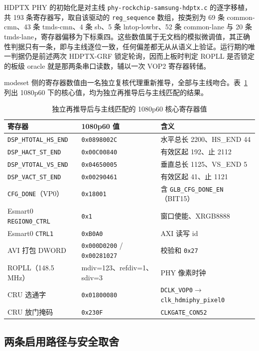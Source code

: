 HDPTX PHY 的初始化是对主线 \texttt{phy-rockchip-samsung-hdptx.c} 的逐字移植，共 193 条寄存器写，取自该驱动的 \texttt{reg\_sequence} 数组，按类别为 69 条 common-cmn、43 条 tmds-cmn、4 条 sb、5 条 lntop-lowbr、52 条 common-lane 与 20 条 tmds-lane，寄存器偏移为下标乘四。这些数值属于无文档的模拟微调值，其正确性判据只有一条，即与主线逐位一致，任何偏差都无从从语义上验证。运行期的唯一判据仍是前述两次 HDPTX-GRF 锁定轮询，因而上板时判定 ROPLL 是否锁定的板级 oracle 就是那两条串口读数，辅以一次 VOP2 寄存器转储。

modeset 侧的寄存器数值由一名独立复核代理重新推导，全部与主线吻合。表~\ref{tab:disp-regs} 列出 1080p60 下的核心值，均为独立再推导后与主线匹配的结果。

\begin{table}[H]\centering\small
\begin{tabular}{@{}>{\raggedright\arraybackslash}p{4.6cm}>{\raggedright\arraybackslash}p{4.4cm}>{\raggedright\arraybackslash}p{3.2cm}@{}}
\toprule
寄存器 & 1080p60 值 & 含义 \\
\midrule
\texttt{DSP\_HTOTAL\_HS\_END} & \texttt{0x0898002C} & 水平总长 2200、HS\_END 44 \\
\texttt{DSP\_HACT\_ST\_END} & \texttt{0x00C00840} & 有效区起 192、止 2112 \\
\texttt{DSP\_VTOTAL\_VS\_END} & \texttt{0x04650005} & 垂直总长 1125、VS\_END 5 \\
\texttt{DSP\_VACT\_ST\_END} & \texttt{0x00290461} & 有效区起 41、止 1121 \\
\texttt{CFG\_DONE}（VP0） & \texttt{0x18001} & 含 \texttt{GLB\_CFG\_DONE\_EN}（BIT15） \\
Esmart0 \texttt{REGION0\_CTRL} & \texttt{0x1} & 窗口使能、XRGB8888 \\
Esmart0 \texttt{CTRL1} & \texttt{0xB0A0} & AXI 读写 id \\
AVI 打包 DWORD & \texttt{0x000D0200} / \texttt{0x00281027} & 校验和 \texttt{0x27} \\
ROPLL（148.5 MHz） & mdiv=123、refdiv=1、sdiv=3 & PHY 像素时钟 \\
CRU 选通字 & \texttt{0x01800080} & \texttt{DCLK\_VOP0}$\to$\texttt{clk\_hdmiphy\_pixel0} \\
CRU 放门掩码 & \texttt{0x230F} & \texttt{CLKGATE\_CON52} \\
\bottomrule
\end{tabular}
\caption{独立再推导后与主线匹配的 1080p60 核心寄存器值}
\label{tab:disp-regs}
\end{table}

\subsection{两条启用路径与安全取舍}

